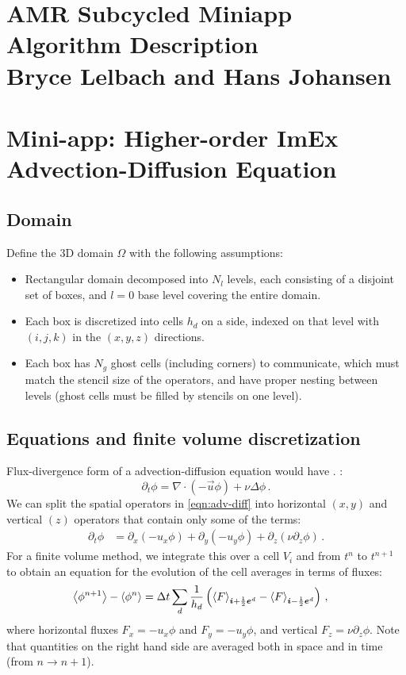 \documentclass[11pt]{article}
\begin{document}
\section*{AMR Subcycled Miniapp Algorithm Description \\
          Bryce Lelbach and Hans Johansen}

\section{Mini-app: Higher-order ImEx Advection-Diffusion Equation}

\subsection{Domain}
Define the 3D domain $\Omega$ with the following assumptions:
\begin{itemize}
  \item Rectangular domain decomposed into $N_l$ levels, each
    consisting of a disjoint set of boxes, and $l = 0$ base level covering
    the entire domain.
  \item Each box is discretized into cells $h_d$ on a side, indexed
    on that level with $(i,j,k)$ in the $(x,y,z)$ directions.
  \item Each box has $N_g$ ghost cells (including corners) to communicate, 
    which must match the stencil size of the operators, and have proper
    nesting between levels 
    (ghost cells must be filled by stencils on one level).
\end{itemize}

\subsection{Equations and finite volume discretization}
Flux-divergence form of a advection-diffusion equation would
  have . :
\begin{equation}
\label{eqn:adv-diff}
  \partial_t \phi = \nabla \cdot \left( - \vec{u} \phi \right) 
    + \nu \Delta \phi \, .
\end{equation}
We can split the spatial operators in \eqref{eqn:adv-diff} into 
  horizontal $(x,y)$ and vertical $(z)$ operators that contain
  only some of the terms:
\begin{align}
\label{eqn:advxy-diffz}
  \partial_t \phi 
    & = \partial_x \left( - u_x \phi \right) 
      + \partial_y \left( - u_y \phi \right) 
      + \partial_z \left( \nu \partial_z \phi \right)  \, .
\end{align}
For a finite volume method, we integrate this over a cell $V_i$ and
  from $t^n$ to $t^{n+1}$ to obtain an
  equation for the evolution of the cell averages in terms of fluxes:
\begin{align}
   \left\langle \phi^{n+1} \right\rangle - \left\langle \phi^n \right\rangle 
    & = {\Delta t} \sum_d \frac{1}{h_d} 
    \left( \left\langle F \right\rangle_{{\boldsymbol{i}}+\frac{1}{2}{\boldsymbol{e}}^d} - \left\langle F \right\rangle_{{\boldsymbol{i}}-\frac{1}{2}{\boldsymbol{e}}^d} \right) \, ,
\end{align}
  where horizontal fluxes $F_x = - u_x \phi$ and $F_y = - u_y \phi$, and 
  vertical $F_z = \nu \partial_{z} \phi$.
Note that quantities on the right hand side are averaged
  both in space and in time (from ${n \rightarrow {n+1}}$).
\end{document}
